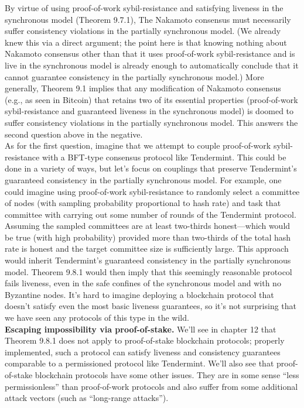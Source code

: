 By virtue of using proof-of-work sybil-resistance and satisfying
liveness in the synchronous model (Theorem 9.7.1), The Nakamoto consensus must necessarily suffer consistency violations in the partially synchronous model. (We already knew this via a direct argument;
the point here is that knowing nothing about Nakamoto consensus other than that it uses
proof-of-work sybil-resistance and is live in the synchronous model is already enough to automatically conclude that it cannot guarantee consistency in the partially synchronous model.)
More generally, Theorem 9.1 implies that any modification of Nakamoto consensus (e.g., as
seen in Bitcoin) that retains two of its essential properties (proof-of-work sybil-resistance and
guaranteed liveness in the synchronous model) is doomed to suffer consistency violations in
the partially synchronous model. This answers the second question above in the negative.\\

As for the first question, imagine that we attempt to couple proof-of-work sybil-resistance
with a BFT-type consensus protocol like Tendermint. This could be done in a variety of
ways, but let’s focus on couplings that preserve Tendermint’s guaranteed consistency in the
partially synchronous model. For example, one could imagine using proof-of-work sybil-resistance to randomly select a committee of nodes (with sampling probability proportional
to hash rate) and task that committee with carrying out some number of rounds of the Tendermint protocol. Assuming the sampled committees are at least two-thirds honest—which
would be true (with high probability) provided more than two-thirds of the total hash rate is
honest and the target committee size is sufficiently large. This approach would inherit Tendermint’s guaranteed consistency in the partially synchronous model. Theorem 9.8.1 would
then imply that this seemingly reasonable protocol fails liveness, even in the safe confines
of the synchronous model and with no Byzantine nodes. It’s hard to imagine deploying a
blockchain protocol that doesn't satisfy even the most basic liveness guarantees, so it’s not
surprising that we have seen any protocols of this type in the wild.\\

\noindent
\textbf{Escaping impossibility via proof-of-stake.} We’ll see in chapter 12 that Theorem 9.8.1
does not apply to proof-of-stake blockchain protocols; properly implemented, such a protocol
can satisfy liveness and consistency guarantees comparable to a permissioned protocol like Tendermint. We’ll also see that proof-of-stake blockchain protocols have some other issues. They are in some sense “less permissionless” than proof-of-work protocols and also suffer from
some additional attack vectors (such as “long-range attacks”).

